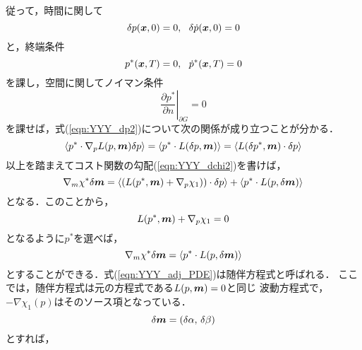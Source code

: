 従って，時間に関して
\begin{equation}
	\delta p(\mbox{\boldmath $x$},0)=0, \ \ \delta \dot{p} (\mbox{\boldmath $x$},0)=0
	\label{eqn:YYY_11}
\end{equation}
と，終端条件
\begin{equation}
	p^*(\mbox{\boldmath $x$},T)=0, \ \ \dot{p}^*(\mbox{\boldmath $x$},T)=0 
	\label{eqn:YYY_12}
\end{equation}
を課し，空間に関してノイマン条件
\begin{equation}
	\left. \frac{\partial p^*}{\partial n}
	\right|_{\partial G}=0
	\label{eqn:yyy_13}
\end{equation}
を課せば，式(\ref{eqn:YYY_dp2})について次の関係が成り立つことが分かる．
\begin{equation}
	\left< p^*  \cdot \nabla_p L(p,\mbox{\boldmath $m$})\delta p \right> 
	=
	\left< p^*  \cdot L(\delta p,\mbox{\boldmath $m$})\right> 
	=
	\left< L(\delta p^*,\mbox{\boldmath $m$}) \cdot \delta p\right> 
	\label{eqn:YYY_14}
\end{equation}
以上を踏まえてコスト関数の勾配(\ref{eqn:YYY_dchi2})を書けば，
\begin{equation}
	\nabla_m \chi^* \delta \mbox{\boldmath $m$}
	=
	\left< 
		\left(L(p^*,\mbox{\boldmath $m$})+\nabla_p\chi_1)\right) \cdot \delta p
	\right>
	+
	\left< p^*  \cdot L(p,\delta \mbox{\boldmath $m$}) \right> 
	\label{eqn:YYY_dchi2_adj}
\end{equation}
となる．このことから，
\begin{equation}
	L(p^*,\mbox{\boldmath $m$})+\nabla_p\chi_1=0
	\label{eqn:YYY_adj_PDE}
\end{equation}
となるように$p^*$を選べば，
\begin{equation}
	\nabla_m \chi^* \delta \mbox{\boldmath $m$}
	=
	\left< p^*  \cdot L(p,\delta \mbox{\boldmath $m$}) \right> 
	\label{eqn:YYY_gradX0}
\end{equation}
とすることができる．式(\ref{eqn:YYY_adj_PDE})は随伴方程式と呼ばれる．
ここでは，随伴方程式は元の方程式である$L(p,\mbox{\boldmath $m$})=0$と同じ
波動方程式で，$-\nabla \chi_1(p)$はそのソース項となっている．
\begin{equation}
	\delta \mbox{\boldmath $m$}=\left( \delta \alpha, \, \delta \beta \right)
	\label{eqn:YYY_d_ab}
\end{equation}
とすれば，
